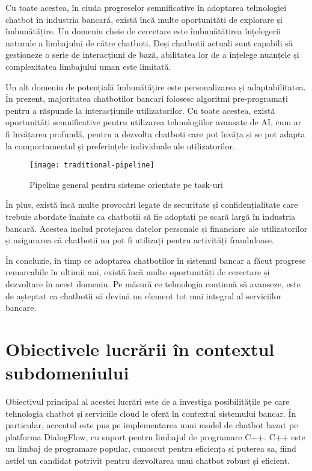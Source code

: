 Cu toate acestea, în ciuda progreselor semnificative în adoptarea tehnologiei chatbot în industria bancară, există încă multe oportunități de explorare și îmbunătățire. Un domeniu cheie de cercetare este îmbunătățirea înțelegerii naturale a limbajului de către chatboti. Deși chatbotii actuali sunt capabili să gestioneze o serie de interacțiuni de bază, abilitatea lor de a înțelege nuanțele și complexitatea limbajului uman este limitată.

Un alt domeniu de potențială îmbunătățire este personalizarea și adaptabilitatea. În prezent, majoritatea chatbotilor bancari folosesc algoritmi pre-programați pentru a răspunde la interacțiunile utilizatorilor. Cu toate acestea, există oportunități semnificative pentru utilizarea tehnologiilor avansate de AI, cum ar fi învățarea profundă, pentru a dezvolta chatboti care pot învăța și se pot adapta la comportamentul și preferințele individuale ale utilizatorilor.

\begin{figure}[h] %
    \centering
    \texttt{[image: traditional-pipeline]}
    \caption{Pipeline general pentru sisteme orientate pe task-uri \cite{chen_liu_yin_tang_dialogue_2017}}
\end{figure}

În plus, există încă multe provocări legate de securitate și confidențialitate care trebuie abordate înainte ca chatbotii să fie adoptați pe scară largă în industria bancară. Acestea includ protejarea datelor personale și financiare ale utilizatorilor și asigurarea că chatbotii nu pot fi utilizați pentru activități frauduloase.

În concluzie, în timp ce adoptarea chatbotilor în sistemul bancar a făcut progrese remarcabile în ultimii ani, există încă multe oportunități de cercetare și dezvoltare în acest domeniu. Pe măsură ce tehnologia continuă să avanseze, este de așteptat ca chatbotii să devină un element tot mai integral al serviciilor bancare.

\section{Obiectivele lucrării în contextul subdomeniului}

Obiectivul principal al acestei lucrări este de a investiga posibilitățile pe care tehnologia chatbot și serviciile cloud le oferă în contextul sistemului bancar. În particular, accentul este pus pe implementarea unui model de chatbot bazat pe platforma DialogFlow, cu suport pentru limbajul de programare C++. C++ este un limbaj de programare popular, cunoscut pentru eficiența și puterea sa, fiind astfel un candidat potrivit pentru dezvoltarea unui chatbot robust și eficient.

